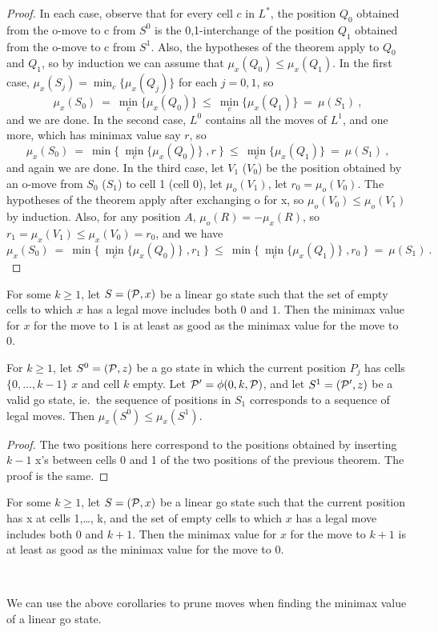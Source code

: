 \begin{proof}
In each case, observe that for every cell $c$ in $L^*$,
the position $Q_0$ obtained from the o-move to c from $S^0$ 
is the 0,1-interchange of 
the position $Q_1$ obtained from the o-move to c from $S^1$.
Also, the hypotheses of the theorem apply to $Q_0$ and $Q_1$,
so by induction we can assume that
$\mu_x(Q_0) \leq \mu_x(Q_1)$.
In the first case, $\mu_x(S_j) = \min_c \{\mu_x(Q_j)\}$
for each $j=0,1$, so
\[ \mu_x(S_0) \: = \: 
\min_c \{\mu_x(Q_0)\} \: \leq \:
\min_c \{\mu_x(Q_1)\} \: = \: 
\mu(S_1) \: , \]
and we are done.
In the second case, $L^0$ contains all the moves of $L^1$,
and one more, which has minimax value say $r$, so
\[ \mu_x(S_0) \: = \: 
\min \{ \: \min_c \{\mu_x(Q_0)\} \; , r \: \} \:  \leq \: 
\min_c \{\mu_x(Q_1)\} \: = \: 
\mu(S_1) \: , \]
and again we are done.
In the third case,
let $V_1$ ($V_0$) be the position
obtained by an o-move from $S_0$ ($S_1$) to cell 1 (cell 0),
let $\mu_o(V_1)$, let $r_0 = \mu_o(V_0)$.
The hypotheses of the theorem apply after exchanging o for x,
so $\mu_o(V_0) \leq \mu_o(V_1)$ by induction.
Also, for any position $A$, $\mu_o(R) = - \mu_x(R)$,
so $r_1 = \mu_x(V_1) \leq \mu_x(V_0) = r_0$, and we have
\[ \mu_x(S_0) \: = \: 
\min \{ \: \min_c \{\mu_x(Q_0)\} \; , r_1 \: \} \: \leq \: 
\min \{ \: \min_c \{\mu_x(Q_1)\} \; , r_0 \: \} \: = \:
\mu(S_1) \: . \]
\end{proof}


\begin{corollary}
For some $k\geq 1$,
let $S=({\mathcal{P}},x)$ be a linear go state
such that the set of empty cells to which
$x$ has a legal move includes both $0$ and $1$.
Then the minimax value for $x$ for the move to $1$
is at least as good as the minimax value for the move to 0.
\end{corollary}

\begin{theorem}
For $k\geq 1$,
let $S^0 =({\mathcal{P}},z)$ be a go state in which the current position
$P_j$ has cells $\{0,\ldots,k-1\}$ $x$ and cell $k$ empty.
Let ${\mathcal{P}}' = \phi(0,k,{\mathcal{P}})$, and let
$S^1 = ({\mathcal{P}}',z)$ be a valid go state, ie.\ the sequence
of positions in $S_1$ corresponds to a sequence of legal moves.
Then $\mu_x(S^0) \leq \mu_x(S^1)$.
\end{theorem}

\begin{proof}
The two positions here correspond to the positions obtained by
inserting $k-1$ x's between cells 0 and 1 
of the two positions of the previous theorem.
The proof is the same.
\end{proof}

\begin{corollary}
For some $k\geq 1$,
let $S=({\mathcal{P}},x)$ be a linear go state
such that the current position has x at cells 1,\ldots, k,
and the set of empty cells to which
$x$ has a legal move includes both $0$ and $k+1$.
Then the minimax value for $x$ for the move to $k+1$
is at least as good as the minimax value for the move to 0.
\end{corollary}

\vfill~

We can use the above corollaries to prune moves when
finding the minimax value of a linear go state.
